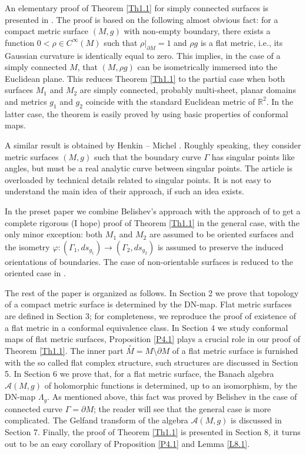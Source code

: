 \documentclass[12pt,reqno]{amsart}
\newcommand{\R}{\mathbb{R}}
\begin{document}
An elementary proof of Theorem \ref{Th1.1} for simply connected surfaces is presented in \cite{Sr2}. The proof is based on the following almost obvious fact: for a compact metric surface $(M,g)$ with non-empty boundary, there exists a function $0<\rho\in C^\infty(M)$ such that $\rho|_{\partial M}=1$ and $\rho g$ is a flat metric, i.e., its Gaussian curvature is identically equal to zero. This implies, in the case of a simply connected $M$, that $(M,\rho g)$ can be isometrically immersed into the Euclidean plane. This reduces Theorem \ref{Th1.1} to the partial case when both surfaces $M_1$ and $M_2$ are simply connected, probably multi-sheet, planar domains and metrics $g_1$ and $g_2$ coincide with the standard Euclidean metric of ${\R}^2$. In the latter case, the theorem is easily proved by using basic properties of conformal maps.

A similar result is obtained by Henkin -- Michel \cite{HM}. Roughly speaking, they consider metric surfaces $(M,g)$ such that the boundary curve $\Gamma$ has singular points like angles, but must be a real analytic curve between singular points. The article is overloaded by technical details related to singular points. It is not easy to understand the main idea of their approach, if such an idea exists.

In the preset paper we combine Belishev's approach \cite{Be} with the approach of \cite{Sr2} to get a complete rigorous (I hope) proof of Theorem \ref{Th1.1} in the general case, with the only minor exception: both $M_1$ and $M_2$ are assumed to be oriented surfaces and the isometry $\varphi:(\Gamma_1,ds_{g_1})\rightarrow(\Gamma_2,ds_{g_2})$ is assumed to preserve the induced orientations of boundaries. The case of non-orientable surfaces is reduced to the oriented case in \cite{BK}.

The rest of the paper is organized as follows. In Section 2 we prove that topology of a compact metric surface is determined by the DN-map.
Flat metric surfaces are defined in Section 3; for completeness, we reproduce the proof of existence of a flat metric in a conformal equivalence class. In Section 4 we study conformal maps of flat metric surfaces, Proposition \ref{P4.1} plays a crucial role in our proof of Theorem \ref{Th1.1}. The inner part $\stackrel\circ M=M\setminus\partial M$ of a flat metric surface is furnished with the so called flat complex structure, such structures are discussed in Section 5. In Section 6 we prove that, for a flat metric surface, the Banach algebra
${\mathcal A}(M,g)$ of holomorphic functions is determined, up to an isomorphism, by the DN-map $\Lambda_g$. As mentioned above, this fact was proved by Belishev in the case of connected curve $\Gamma=\partial M$; the reader will see that the general case is more complicated. The Gelfand transform of the algebra ${\mathcal A}(M,g)$ is discussed in Section 7. Finally, the proof of Theorem \ref{Th1.1} is presented in Section 8, it turns out to be an easy corollary of Proposition \ref{P4.1} and Lemma \ref{L8.1}.
\end{document}
